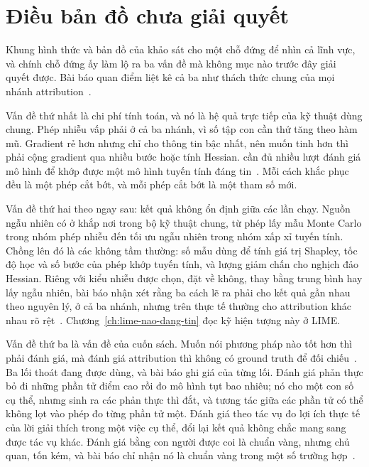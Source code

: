 \section{Điều bản đồ chưa giải quyết}
\label{sec:ch07-dieu-chua-giai-quyet}

%
%
%
Khung hình thức và bản đồ của khảo sát cho một chỗ đứng để nhìn cả lĩnh vực, và
chính chỗ đứng ấy làm lộ ra ba vấn đề mà không mục nào trước đây giải quyết
được. Bài báo quan điểm liệt kê cả ba như thách thức chung của mọi nhánh
attribution~\autocite{p18unified}.

Vấn đề thứ nhất là chi phí tính toán, và nó là hệ quả trực tiếp của kỹ thuật
dùng chung. Phép nhiễu vấp phải  ở cả ba nhánh, vì số tập con
cần thử tăng theo hàm mũ. Gradient rẻ hơn nhưng chỉ cho thông tin bậc nhất, nên
muốn tinh hơn thì phải cộng gradient qua nhiều bước hoặc tính Hessian.
 cần đủ nhiều lượt đánh giá mô hình
để khớp được một mô hình tuyến tính đáng tin~\autocite{p18unified}. Mỗi cách khắc phục đều là một phép cắt bớt,
và mỗi phép cắt bớt là một tham số mới.

Vấn đề thứ hai theo ngay sau: kết quả không ổn định giữa các lần chạy. Nguồn
ngẫu nhiên có ở khắp nơi trong bộ kỹ thuật chung, từ phép lấy mẫu Monte Carlo
trong nhóm phép nhiễu đến tối ưu ngẫu nhiên trong nhóm xấp xỉ tuyến tính. Chồng
lên đó là các  không tầm thường: số mẫu dùng
để tính giá trị Shapley,
tốc độ học và số bước của phép khớp tuyến tính, và lượng giảm chấn cho nghịch
đảo Hessian. Riêng với kiểu nhiễu được chọn, đặt về không, thay bằng trung
bình hay lấy ngẫu nhiên, bài báo nhận xét rằng ba cách lẽ ra phải cho kết quả
gần nhau theo nguyên lý, ở cả ba nhánh, nhưng trên thực tế thường cho
attribution khác nhau rõ rệt~\autocite{p18unified}. Chương~\ref{ch:lime-nao-dang-tin} đọc kỹ hiện
tượng này ở LIME.

Vấn đề thứ ba là vấn đề của cuốn sách. Muốn nói phương pháp nào tốt hơn thì phải
đánh giá, mà đánh giá attribution thì không có ground truth để đối
chiếu~\autocite{p18unified}. Ba lối thoát đang được dùng, và bài báo ghi giá của
từng lối. Đánh giá phản thực bỏ đi những phần tử điểm cao rồi đo mô hình tụt bao
nhiêu; nó cho một con số cụ thể, nhưng sinh ra các phản thực thì đắt, và tương
tác giữa các phần tử có thể không lọt vào phép đo từng phần tử một. Đánh giá
theo tác vụ đo lợi ích thực tế của lời giải thích trong một việc cụ thể, đổi lại
kết quả không chắc mang sang được tác vụ khác. Đánh giá bằng con người được coi
là chuẩn vàng, nhưng chủ quan, tốn kém, và bài báo chỉ nhận nó là chuẩn vàng
trong một số trường hợp~\autocite{p18unified}.

